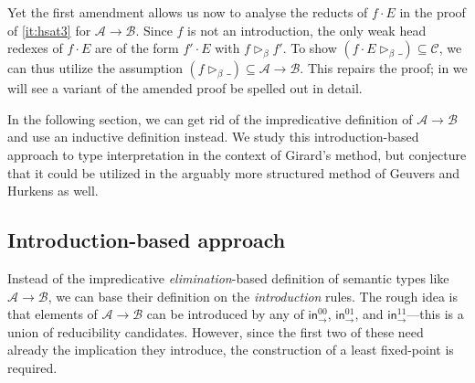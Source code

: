 \documentclass[a4paper,USenglish,cleveref, autoref, thm-restate]{lipics-v2021}
\newcommand{\tin}{\ensuremath{\mathsf{in}}}
\newcommand{\inn}[2]{\ensuremath{\tin_{#1}^{#2}}}
\newcommand{\whd}[1][]{\rhd_{#1}}
\newcommand{\CR}{\mathsf{CR}}
\newcommand{\A}{\mathcal{A}}
\newcommand{\B}{\mathcal{B}}
\newcommand{\C}{\mathcal{C}}
\newcommand{\SAT}{\mathsf{SAT}}
\begin{document}
Yet the first amendment allows us now to analyse the reducts of
$f \cdot E$ in the proof of \ref{it:hsat3} for $\A \to \B$.  Since $f$
is not an introduction, the only weak head redexes of $f \cdot E$ are
of the form $f' \cdot E$ with $f \whd[\beta] f'$.  To show $(f \cdot E
\whd[\beta] \_) \subseteq \C$, we can thus utilize the assumption
$(f \whd[\beta] \_) \subseteq \A \to \B$.
This repairs the proof; in  we will see a variant of
the amended proof be spelled out in detail.


In the following section, we can get rid of the
impredicative definition of $\A \to \B$ and use an inductive
definition instead.
We study this introduction-based approach to type interpretation in
the context of Girard's method, but conjecture that it could be
utilized in the arguably more structured method of Geuvers and Hurkens as
well.



\subsection{Introduction-based approach}
\label{sec:introbased}

Instead of the impredicative \emph{elimination}-based definition of semantic
types like $\A \to \B$, we can base their definition on the \emph{introduction}
rules.  The rough idea is that elements of $\A \to \B$ can be
introduced by any of $\inn\to{00}$, $\inn\to{01}$, and
$\inn\to{11}$---this is a union of reducibility candidates.
However, since the first two of these need already the implication
they introduce, the construction of a least fixed-point is required.
\end{document}
